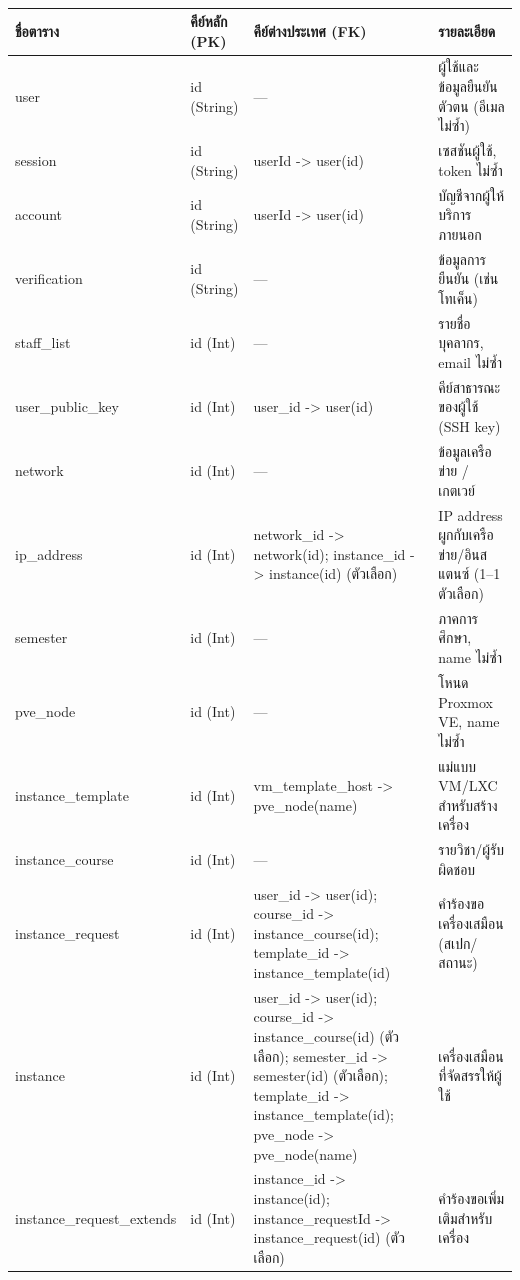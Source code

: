 \begin{table}[htbp]
    \caption{}\label{tab3:db_schema_overview}
    \centering
    \renewcommand{\arraystretch}{1.2}
    \small
    \begin{tabular}{p{} p{} p{} p{}}
        \hline
            \textbf{ชื่อตาราง} & \textbf{คีย์หลัก (PK)} & \textbf{คีย์ต่างประเทศ (FK)} & \textbf{รายละเอียด} \\
        \hline
        user & id (String) & — & ผู้ใช้และข้อมูลยืนยันตัวตน (อีเมลไม่ซ้ำ) \\
        session & id (String) & userId -> user(id) & เซสชันผู้ใช้, token ไม่ซ้ำ \\
        account & id (String) & userId -> user(id) & บัญชีจากผู้ให้บริการภายนอก \\
        verification & id (String) & — & ข้อมูลการยืนยัน (เช่น โทเค็น) \\
        staff\_list & id (Int) & — & รายชื่อบุคลากร, email ไม่ซ้ำ \\
        user\_public\_key & id (Int) & user\_id -> user(id) & คีย์สาธารณะของผู้ใช้ (SSH key) \\
        network & id (Int) & — & ข้อมูลเครือข่าย / เกตเวย์ \\
        ip\_address & id (Int) & network\_id -> network(id); instance\_id -> instance(id) (ตัวเลือก) & IP address ผูกกับเครือข่าย/อินสแตนซ์ (1–1 ตัวเลือก) \\
        semester & id (Int) & — & ภาคการศึกษา, name ไม่ซ้ำ \\
        pve\_node & id (Int) & — & โหนด Proxmox VE, name ไม่ซ้ำ \\
        instance\_template & id (Int) & vm\_template\_host -> pve\_node(name) & แม่แบบ VM/LXC สำหรับสร้างเครื่อง \\
        instance\_course & id (Int) & — & รายวิชา/ผู้รับผิดชอบ \\
        instance\_request & id (Int) & user\_id -> user(id); course\_id -> instance\_course(id); template\_id -> instance\_template(id) & คำร้องขอเครื่องเสมือน (สเปก/สถานะ) \\
        instance & id (Int) & user\_id -> user(id); course\_id -> instance\_course(id) (ตัวเลือก); semester\_id -> semester(id) (ตัวเลือก); template\_id -> instance\_template(id); pve\_node -> pve\_node(name) & เครื่องเสมือนที่จัดสรรให้ผู้ใช้ \\
        instance\_request\_extends & id (Int) & instance\_id -> instance(id); instance\_requestId -> instance\_request(id) (ตัวเลือก) & คำร้องขอเพิ่มเติมสำหรับเครื่อง \\
        \hline
    \end{tabular}
\end{table}


